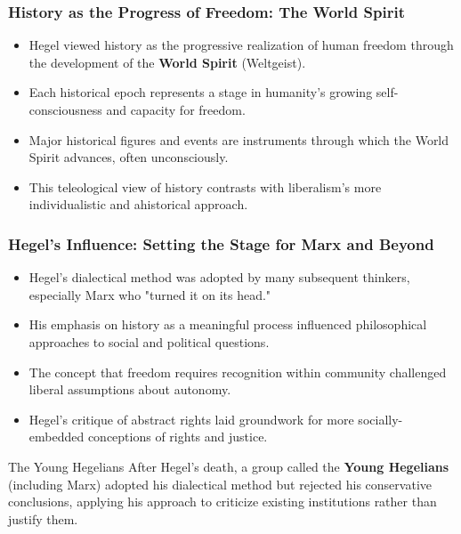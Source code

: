 \documentclass{beamer}
\begin{document}
\begin{frame}
\frametitle{History as the Progress of Freedom: The World Spirit}
\begin{itemize}
    \item Hegel viewed history as the progressive realization of human freedom through the development of the \textbf{World Spirit} (Weltgeist).
    \item Each historical epoch represents a stage in humanity's growing self-consciousness and capacity for freedom.
    \item Major historical figures and events are instruments through which the World Spirit advances, often unconsciously.
    \item This teleological view of history contrasts with liberalism's more individualistic and ahistorical approach.
\end{itemize}

\begin{center}
\end{center}
\end{frame}

\begin{frame}
\frametitle{Hegel's Influence: Setting the Stage for Marx and Beyond}
\begin{itemize}
    \item Hegel's dialectical method was adopted by many subsequent thinkers, especially Marx who "turned it on its head."
    \item His emphasis on history as a meaningful process influenced philosophical approaches to social and political questions.
    \item The concept that freedom requires recognition within community challenged liberal assumptions about autonomy.
    \item Hegel's critique of abstract rights laid groundwork for more socially-embedded conceptions of rights and justice.
\end{itemize}

\begin{alertblock}{The Young Hegelians}
After Hegel's death, a group called the \textbf{Young Hegelians} (including Marx) adopted his dialectical method but rejected his conservative conclusions, applying his approach to criticize existing institutions rather than justify them.
\end{alertblock}
\end{frame}
\end{document}
